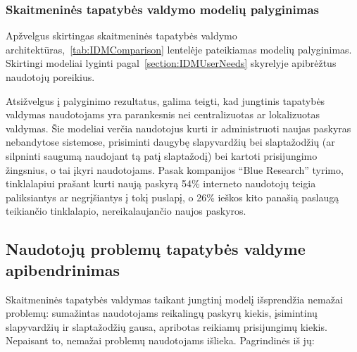 \subsubsection{Skaitmeninės tapatybės valdymo modelių palyginimas}

Apžvelgus skirtingas skaitmeninės tapatybės valdymo architektūras,~\ref{tab:IDMComparison} lentelėje pateikiamas modelių palyginimas.
Skirtingi modeliai lyginti pagal~\ref{section:IDMUserNeeds} skyrelyje apibrėžtus naudotojų poreikius. 

Atsižvelgus į palyginimo rezultatus, galima teigti, kad jungtinis tapatybės valdymas naudotojams yra parankesnis nei centralizuotas
ar lokalizuotas valdymas. Šie modeliai verčia naudotojus kurti ir administruoti naujas paskyras nebandytose sistemose,
prisiminti daugybę slapyvardžių bei slaptažodžių (ar silpninti saugumą naudojant tą patį slaptažodį) bei kartoti prisijungimo žingsnius,
o tai įkyri naudotojams. Pasak kompanijos \enquote{Blue Research} tyrimo, tinklalapiui prašant kurti naują paskyrą 54\% interneto naudotojų
teigia paliksiantys ar negrįšiantys į tokį puslapį, o 26\% ieškos kito panašią paslaugą teikiančio tinklalapio, nereikalaujančio naujos paskyros. 



\subsection{Naudotojų problemų tapatybės valdyme apibendrinimas} \label{IDM:problemsSummarized}

Skaitmeninės tapatybės valdymas taikant jungtinį modelį išsprendžia nemažai problemų: sumažintas
naudotojams reikalingų paskyrų kiekis, įsimintinų slapyvardžių ir slaptažodžių gausa, apribotas
reikiamų prisijungimų kiekis. Nepaisant to, nemažai problemų naudotojams išlieka. Pagrindinės iš jų:


